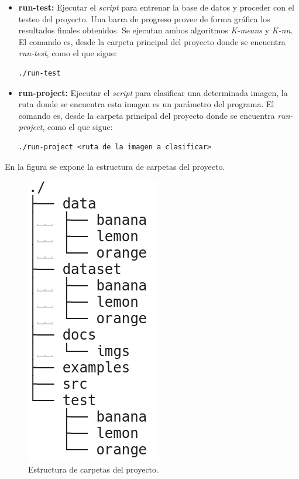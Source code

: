 \documentclass[10pt,a4paper]{article}
\begin{document}
\begin{itemize}
\item \textbf{run-test:} Ejecutar el \textit{script} para entrenar la base de datos y proceder con el testeo del proyecto. Una barra de progreso provee de forma gráfica los resultados finales obtenidos. Se ejecutan ambos algoritmos \textit{K-means} y \textit{K-nn}. El comando es, desde la carpeta principal del proyecto donde se encuentra \textit{run-test}, como el que sigue:
\begin{verbatim}
./run-test
\end{verbatim}
\item \textbf{run-project:} Ejecutar el \textit{script} para clasificar una determinada imagen, la ruta donde se encuentra esta imagen es un parámetro del programa. El comando es, desde la carpeta principal del proyecto donde se encuentra \textit{run-project}, como el que sigue:
\begin{verbatim}
./run-project <ruta de la imagen a clasificar>
\end{verbatim}
\end{itemize}

En la figura se expone la estructura de carpetas del proyecto.

\begin{figure}[h]
\centering
\includegraphics[scale=0.4]{imgs/folders-structure.png}
\caption{Estructura de carpetas del proyecto.}
\label{folders}
\end{figure}
\end{document}
